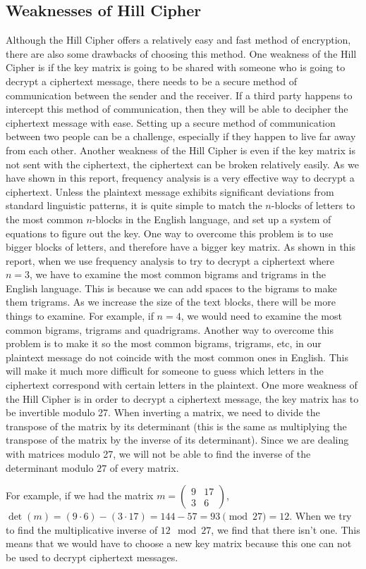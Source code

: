 \documentclass{article}
\begin{document}
\subsection{Weaknesses of Hill Cipher}
Although the Hill Cipher offers a relatively easy and fast method of encryption, there are also some drawbacks of choosing this method. One weakness of the Hill Cipher is if the key matrix is going to be shared with someone who is going to decrypt a ciphertext message, there needs to be a secure method of communication between the sender and the receiver. If a third party happens to intercept this method of communication, then they will be able to decipher the ciphertext message with ease. Setting up a secure method of communication between two people can be a challenge, especially if they happen to live far away from each other. Another weakness of the Hill Cipher is even if the key matrix is not sent with the ciphertext, the ciphertext can be broken relatively easily. As we have shown in this report, frequency analysis is a very effective way to decrypt a ciphertext. Unless the plaintext message exhibits significant deviations from standard linguistic patterns, it is quite simple to match the $n$-blocks of letters to the most common $n$-blocks in the English language, and set up a system of equations to figure out the key. One way to overcome this problem is to use bigger blocks of letters, and therefore have a bigger key matrix. As shown in this report, when we use frequency analysis to try to decrypt a ciphertext where $n=3$, we have to examine the most common bigrams and trigrams in the English language. This is because we can add spaces to the bigrams to make them trigrams. As we increase the size of the text blocks, there will be more things to examine. For example, if $n=4$, we would need to examine the most common bigrams, trigrams and quadrigrams. Another way to overcome this problem is to make it so the most common bigrams, trigrams, etc, in our plaintext message do not coincide with the most common ones in English. This will make it much more difficult for someone to guess which letters in the ciphertext correspond with certain letters in the plaintext.
One more weakness of the Hill Cipher is in order to decrypt a ciphertext message, the key matrix has to be invertible modulo 27. When inverting a matrix, we need to divide the transpose of the matrix by its determinant (this is the same as multiplying the transpose of the matrix by the inverse of its determinant). Since we are dealing with matrices modulo 27, we will not be able to find the inverse of the determinant modulo $27$ of every matrix.
\par For example, if we had the matrix $m =
\left(\begin{smallmatrix}
    9 & 17\\
    3 & 6
\end{smallmatrix}\right)$, $\det(m) = (9\cdot6) - (3\cdot17) = 144-57 = 93 \pmod{27} = 12 $. When we try to find the multiplicative inverse of $12 \mod{27}$, we find that there isn't one. This means that we would have to choose a new key matrix because this one can not be used to decrypt ciphertext messages.
\end{document}

